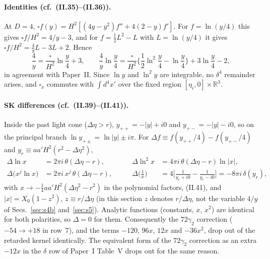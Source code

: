 \documentclass[aps,prd,onecolumn,10pt,nofootinbib,floatfix]{revtex4-2}
\newcommand{\PI}{Paper~I}
\newcommand{\PII}{Paper~II}
\newcommand{\eqII}[1]{(II.#1)}
\begin{document}
\paragraph*{Identities (cf.\ \eqII{35}--\eqII{36}).}
At $D=4$, $\square f(y)=H^2[(4y-y^2)f''+4(2-y)f']$. For $f=\ln(y/4)$ this gives $\square f/H^2=4/y-3$, and for
$f=\frac12L^2-L$ with $L=\ln(y/4)$ it gives $\square f/H^2=\frac4yL-3L+2$. Hence
\begin{equation}
\frac4y=\frac{\square}{H^2}\ln\frac y4+3,\qquad
\frac4y\ln\frac y4=\frac{\square}{H^2}\Big\{\frac12\ln^2\frac y4-\ln\frac y4\Big\}+3\ln\frac y4-2,
\label{eq:s6:3536}
\end{equation}
in agreement with \PII\@. Since $\ln y$ and $\ln^2y$ are integrable, no $\delta^4$ remainder arises, and $\square_x$ commutes
with $\int d^4x'$ over the fixed region $[\eta_i,0]\times\mathbb R^3$.

\paragraph*{SK differences (cf.\ \eqII{39}--\eqII{41}).}
Inside the past light cone ($\Delta\eta>r$), $y_{++}=-|y|+i0$ and $y_{+-}=-|y|-i0$, so on the principal branch
$\ln y_{+\pm}=\ln|y|\pm i\pi$. For $\Delta f\equiv f(y_{++}/4)-f(y_{+-}/4)$ and $y_r\equiv aa'H^2(r^2-\Delta\eta^2)$,
\begin{equation}
\begin{aligned}
\Delta\ln x&=2\pi i\,\theta(\Delta\eta-r),&\qquad
\Delta\ln^2x&=4\pi i\,\theta(\Delta\eta-r)\ln|x|,\\
\Delta\big(x^j\ln x\big)&=2\pi i\,x^j\,\theta(\Delta\eta-r),&\qquad
\Delta\Big(\frac1x\Big)&=4\Big[\frac1{y_r+i0}-\frac1{y_r-i0}\Big]=-8\pi i\,\delta(y_r),
\end{aligned}
\label{eq:s6:Delta}
\end{equation}
with $x\to-\frac14aa'H^2(\Delta\eta^2-r^2)$ in the polynomial factors, \eqII{41}, and $|x|=X_0(1-z^2)$, $z\equiv r/\Delta\eta$ (in
this section $z$ denotes $r/\Delta\eta$, not the variable $4/y$ of Secs.~\ref{sec:s4b} and~\ref{sec:s5}).
Analytic functions (constants, $x$, $x^2$) are identical for both polarities, so $\Delta=0$ for them. Consequently the
$72\gamma_2$ correction ($-54\to+18$ in row~7), and the terms $-120$, $96x$, $12x$ and $-36x^2$, drop out of the retarded
kernel identically. The equivalent form of the $72\gamma_2$ correction as an extra $-12x$ in the $\delta$ row of \PI{}
Table~V drops out for the same reason.
\end{document}
